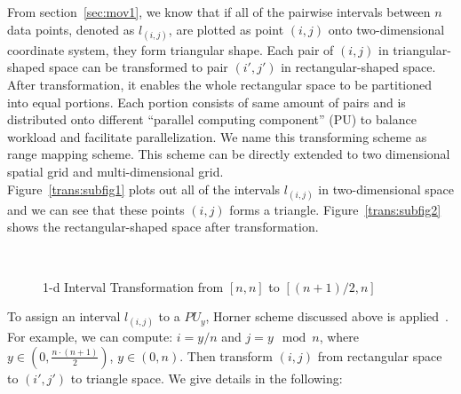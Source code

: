 \documentclass[AMA,LATO1COL]{WileyNJD-v2}
\begin{document}
From section~\ref{sec:mov1}, we know that if all of the pairwise intervals between $n$ data points, denoted as $l_{(i,j)}$, are plotted as point $(i,j)$ onto two-dimensional coordinate system, they form triangular shape. Each pair of $(i,j)$ in triangular-shaped space can be transformed to pair $(i',j')$ in rectangular-shaped space. After transformation, it enables the whole rectangular space to be partitioned into equal portions. Each portion consists of same amount of pairs and is distributed onto different ``parallel computing component'' (PU) to balance workload and facilitate parallelization. We name this transforming scheme as range mapping scheme. This scheme can be directly extended to two dimensional spatial grid and multi-dimensional grid.\\
Figure~\ref{trans:subfig1} plots out all of the intervals $l_{(i,j)}$ in two-dimensional space and we can see that these points $(i,j)$ forms a triangle. Figure~\ref{trans:subfig2} shows the rectangular-shaped space after transformation.

\begin{figure}[h]
\centering
{}
~~
\caption{1-d Interval Transformation from $[n,n]$ to $[(n+1)/2,n]$}\label{modelBF}
\end{figure}

To assign an interval $l_(i,j)$ to a $PU_y$, Horner scheme discussed above is applied~\cite{horner}. For example, we can compute: $i=y/n$ and $j= y \mod n$, where    $y \in (0,{\frac{n \cdot (n+1)}{2}})$, $y \in(0,n)$. Then transform $(i,j)$ from rectangular space to $(i',j')$  to triangle space. We give details in the following:
\end{document}
